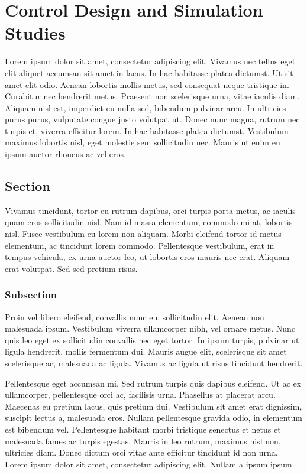 \chapter{Control Design and Simulation Studies}
\label{chapter3}

Lorem ipsum dolor sit amet, consectetur adipiscing elit. Vivamus nec tellus eget elit aliquet accumsan sit amet in lacus. In hac habitasse platea dictumst. Ut sit amet elit odio. Aenean lobortis mollis metus, sed consequat neque tristique in. Curabitur nec hendrerit metus. Praesent non scelerisque urna, vitae iaculis diam. Aliquam nisl est, imperdiet eu nulla sed, bibendum pulvinar arcu. In ultricies purus purus, vulputate congue justo volutpat ut. Donec nunc magna, rutrum nec turpis et, viverra efficitur lorem. In hac habitasse platea dictumst. Vestibulum maximus lobortis nisl, eget molestie sem sollicitudin nec. Mauris ut enim eu ipsum auctor rhoncus ac vel eros.

\section{Section}
Vivamus tincidunt, tortor eu rutrum dapibus, orci turpis porta metus, ac iaculis quam eros sollicitudin nisl. Nam id massa elementum, commodo mi at, lobortis nisl. Fusce vestibulum eu lorem non aliquam. Morbi eleifend tortor id metus elementum, ac tincidunt lorem commodo. Pellentesque vestibulum, erat in tempus vehicula, ex urna auctor leo, ut lobortis eros mauris nec erat. Aliquam erat volutpat. Sed sed pretium risus.

\subsection{Subsection}
Proin vel libero eleifend, convallis nunc eu, sollicitudin elit. Aenean non malesuada ipsum. Vestibulum viverra ullamcorper nibh, vel ornare metus. Nunc quis leo eget ex sollicitudin convallis nec \cite{Maeda1999} eget tortor. In ipsum turpis, pulvinar ut ligula hendrerit, mollis fermentum dui. Mauris augue elit, scelerisque sit amet scelerisque ac, malesuada ac ligula. Vivamus ac ligula ut risus tincidunt hendrerit.

Pellentesque eget accumsan mi. Sed rutrum turpis quis dapibus eleifend. Ut ac ex ullamcorper, pellentesque orci ac, facilisis urna. Phasellus at placerat arcu. Maecenas eu pretium lacus, quis pretium dui. Vestibulum sit amet erat dignissim, suscipit lectus a, malesuada eros. Nullam pellentesque gravida odio, in elementum est bibendum vel. Pellentesque habitant morbi tristique senectus et netus et malesuada fames ac turpis egestas. Mauris in leo rutrum, maximus nisl non, ultricies diam. Donec dictum orci vitae ante efficitur tincidunt id non urna. Lorem ipsum dolor sit amet, consectetur adipiscing elit. Nullam a ipsum ipsum.